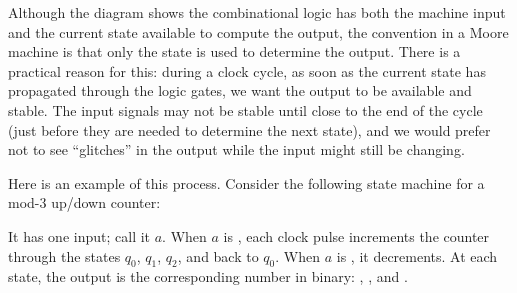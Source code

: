 Although the diagram shows the combinational logic has both the machine input and the current state available to compute the output, the convention in a Moore machine is that only the state is used to determine the output. There is a practical reason for this: during a clock cycle, as soon as the current state has propagated through the logic gates, we want the output to be available and stable. The input signals may not be stable until close to the end of the cycle (just before they are needed to determine the next state), and we would prefer not to see ``glitches'' in the output while the input might still be changing.

Here is an example of this process. Consider the following state machine for a mod-3 up/down counter:
\begin{center}
\end{center}
It has one input; call it $a$. When $a$ is \0, each clock pulse increments the counter through the states $q_0$, $q_1$, $q_2$, and back to $q_0$. When $a$ is \1, it decrements. At each state, the output is the corresponding number in binary: \0\0, \0\1, and \1\0.

